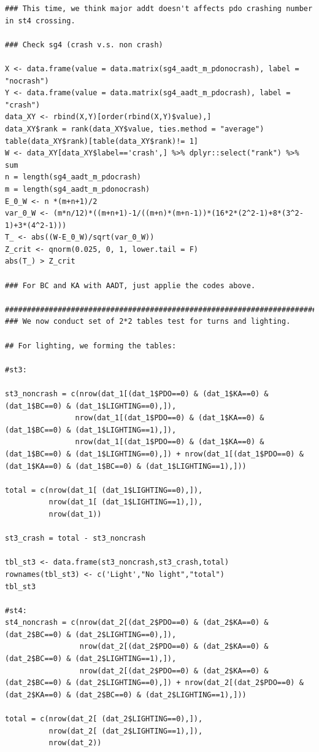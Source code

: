 \documentclass[11pt]{scrartcl} %
\begin{document}
\begin{lstlisting}
### This time, we think major addt doesn't affects pdo crashing number in st4 crossing.

### Check sg4 (crash v.s. non crash)

X <- data.frame(value = data.matrix(sg4_aadt_m_pdonocrash), label = "nocrash")
Y <- data.frame(value = data.matrix(sg4_aadt_m_pdocrash), label = "crash")
data_XY <- rbind(X,Y)[order(rbind(X,Y)$value),]
data_XY$rank = rank(data_XY$value, ties.method = "average")
table(data_XY$rank)[table(data_XY$rank)!= 1]
W <- data_XY[data_XY$label=='crash',] %>% dplyr::select("rank") %>% sum
n = length(sg4_aadt_m_pdocrash)
m = length(sg4_aadt_m_pdonocrash)
E_0_W <- n *(m+n+1)/2
var_0_W <- (m*n/12)*((m+n+1)-1/((m+n)*(m+n-1))*(16*2*(2^2-1)+8*(3^2-1)+3*(4^2-1)))
T_ <- abs((W-E_0_W)/sqrt(var_0_W))
Z_crit <- qnorm(0.025, 0, 1, lower.tail = F)
abs(T_) > Z_crit

### For BC and KA with AADT, just applie the codes above.

#####################################################################################
### We now conduct set of 2*2 tables test for turns and lighting.

## For lighting, we forming the tables:

#st3:

st3_noncrash = c(nrow(dat_1[(dat_1$PDO==0) & (dat_1$KA==0) & (dat_1$BC==0) & (dat_1$LIGHTING==0),]),
                nrow(dat_1[(dat_1$PDO==0) & (dat_1$KA==0) & (dat_1$BC==0) & (dat_1$LIGHTING==1),]),
                nrow(dat_1[(dat_1$PDO==0) & (dat_1$KA==0) & (dat_1$BC==0) & (dat_1$LIGHTING==0),]) + nrow(dat_1[(dat_1$PDO==0) & (dat_1$KA==0) & (dat_1$BC==0) & (dat_1$LIGHTING==1),]))

total = c(nrow(dat_1[ (dat_1$LIGHTING==0),]),
          nrow(dat_1[ (dat_1$LIGHTING==1),]),
          nrow(dat_1))

st3_crash = total - st3_noncrash

tbl_st3 <- data.frame(st3_noncrash,st3_crash,total)
rownames(tbl_st3) <- c('Light',"No light","total")
tbl_st3

#st4:
st4_noncrash = c(nrow(dat_2[(dat_2$PDO==0) & (dat_2$KA==0) & (dat_2$BC==0) & (dat_2$LIGHTING==0),]),
                 nrow(dat_2[(dat_2$PDO==0) & (dat_2$KA==0) & (dat_2$BC==0) & (dat_2$LIGHTING==1),]),
                 nrow(dat_2[(dat_2$PDO==0) & (dat_2$KA==0) & (dat_2$BC==0) & (dat_2$LIGHTING==0),]) + nrow(dat_2[(dat_2$PDO==0) & (dat_2$KA==0) & (dat_2$BC==0) & (dat_2$LIGHTING==1),]))

total = c(nrow(dat_2[ (dat_2$LIGHTING==0),]),
          nrow(dat_2[ (dat_2$LIGHTING==1),]),
          nrow(dat_2))


\end{lstlisting}
\end{document}
